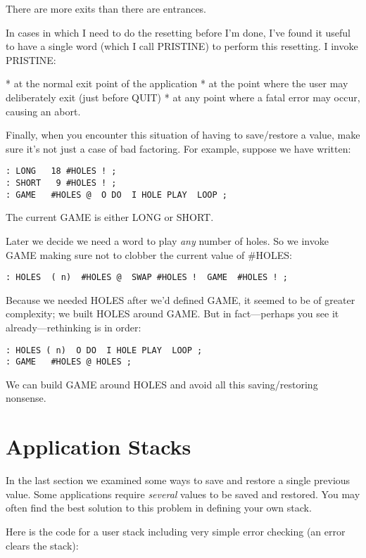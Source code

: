There are more exits than there are entrances.

In cases in which I need to do the resetting before I'm done, I've found it
useful to have a single word (which I call PRISTINE) to perform this
resetting. I invoke PRISTINE:

* at the normal exit point of the application
* at the point where the user may deliberately exit (just before QUIT)
* at any point where a fatal error may occur, causing an abort.

Finally, when you encounter this situation of having to save/restore a
value, make sure it's not just a case of bad factoring. For example,
suppose we have written:

\begin{verbatim}
: LONG   18 #HOLES ! ;
: SHORT   9 #HOLES ! ;
: GAME   #HOLES @  O DO  I HOLE PLAY  LOOP ;
\end{verbatim}

The current GAME is either LONG or SHORT.

Later we decide we need a word to play \emph{any} number of holes. So we
invoke GAME making sure not to clobber the current value of #HOLES:

\begin{verbatim}
: HOLES  ( n)  #HOLES @  SWAP #HOLES !  GAME  #HOLES ! ;
\end{verbatim}

Because we needed HOLES after we'd defined GAME, it seemed to be of
greater complexity; we built HOLES around GAME. But in fact---perhaps
you see it already---rethinking is in order:

\begin{verbatim}
: HOLES ( n)  O DO  I HOLE PLAY  LOOP ;
: GAME   #HOLES @ HOLES ;
\end{verbatim}

We can build GAME around HOLES and avoid all this saving/restoring
nonsense.

\section{Application Stacks}

In the last section we examined some ways to save and restore a single
previous value. Some applications require \emph{several} values to be saved and
restored. You may often find the best solution to this problem in defining
your own stack.

Here is the code for a user stack including very simple error checking
(an error clears the stack):

